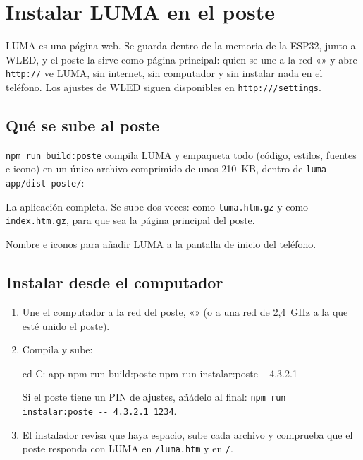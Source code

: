 \chapter{Instalar LUMA en el poste}\label{cap:instalar}

LUMA es una página web. Se guarda dentro de la memoria de la ESP32, junto a WLED, y el poste la sirve como página principal: quien se une a la red «» y abre \texttt{http://} ve LUMA, sin internet, sin computador y sin instalar nada en el teléfono. Los ajustes de WLED siguen disponibles en \texttt{http:///settings}.

\section{Qué se sube al poste}

\texttt{npm run build:poste} compila LUMA y empaqueta todo (código, estilos, fuentes e icono) en un único archivo comprimido de unos 210~KB, dentro de \texttt{luma-app/dist-poste/}:

\begin{description}[leftmargin=1.5em, style=nextline]
\item[\texttt{luma.htm.gz}] La aplicación completa. Se sube dos veces: como \texttt{luma.htm.gz} y como \texttt{index.htm.gz}, para que sea la página principal del poste.
\item[\texttt{luma.webmanifest}, \texttt{luma-192.png}, \texttt{luma-512.png}] Nombre e iconos para añadir LUMA a la pantalla de inicio del teléfono.
\end{description}

\section{Instalar desde el computador}

\begin{enumerate}
\item Une el computador a la red del poste, «» (o a una red de 2,4~GHz a la que esté unido el poste).
\item Compila y sube:
\begin{comando}
cd C:\Proyectos\LUMA\luma-app
npm run build:poste
npm run instalar:poste -- 4.3.2.1
\end{comando}
Si el poste tiene un PIN de ajustes, añádelo al final: \texttt{npm run instalar:poste -{}- 4.3.2.1 1234}.
\item El instalador revisa que haya espacio, sube cada archivo y comprueba que el poste responda con LUMA en \texttt{/luma.htm} y en \texttt{/}.
\end{enumerate}

